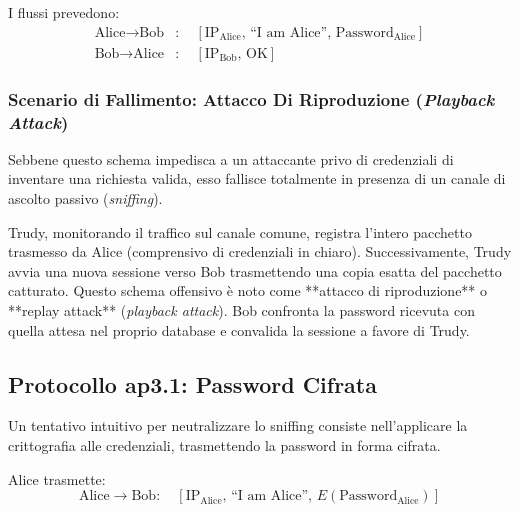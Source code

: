 \documentclass[11pt, a4paper]{article}
\begin{document}

I flussi prevedono:
\begin{align*}
    \text{Alice} \longrightarrow \text{Bob}&: \quad [\text{IP}_{\text{Alice}}, \, \text{``I am Alice''}, \, \text{Password}_{\text{Alice}}] \\
    \text{Bob} \longrightarrow \text{Alice}&: \quad [\text{IP}_{\text{Bob}}, \, \text{OK}]
\end{align*}

\subsubsection{Scenario di Fallimento: Attacco Di Riproduzione (\emph{Playback Attack})}
Sebbene questo schema impedisca a un attaccante privo di credenziali di inventare una richiesta valida, esso fallisce totalmente in presenza di un canale di ascolto passivo (\emph{sniffing}).


Trudy, monitorando il traffico sul canale comune, registra l'intero pacchetto trasmesso da Alice (comprensivo di credenziali in chiaro). Successivamente, Trudy avvia una nuova sessione verso Bob trasmettendo una copia esatta del pacchetto catturato. Questo schema offensivo è noto come **attacco di riproduzione** o **replay attack** (\emph{playback attack}). Bob confronta la password ricevuta con quella attesa nel proprio database e convalida la sessione a favore di Trudy.

\subsection{Protocollo ap3.1: Password Cifrata}

Un tentativo intuitivo per neutralizzare lo sniffing consiste nell'applicare la crittografia alle credenziali, trasmettendo la password in forma cifrata.


Alice trasmette:
\[
\text{Alice} \longrightarrow \text{Bob}: \quad [\text{IP}_{\text{Alice}}, \, \text{``I am Alice''}, \, E(\text{Password}_{\text{Alice}})]
\]
\end{document}
